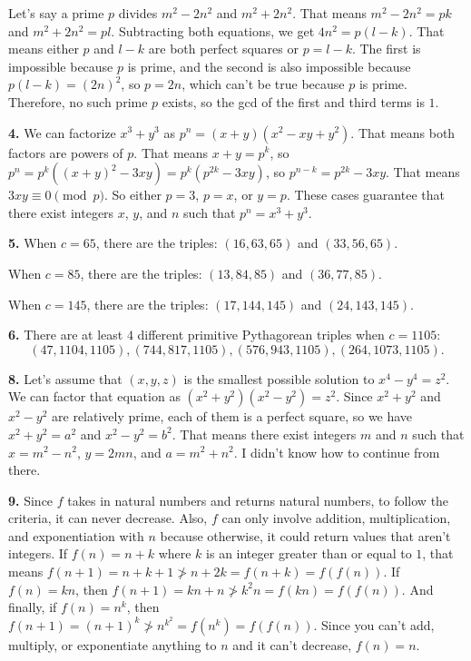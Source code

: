 \documentclass{article}
\begin{document}
Let's say a prime $p$ divides $m^2 - 2n^2$ and $m^2 + 2n^2$. That means $m^2 - 2n^2 = pk$ and $m^2 + 2n^2 = pl$. Subtracting both equations, we get $4n^2 = p(l - k)$. That means either $p$ and $l - k$ are both perfect squares or $p = l - k$. The first is impossible because $p$ is prime, and the second is also impossible because $p(l - k) = (2n)^2$, so $p = 2n$, which can't be true because $p$ is prime. Therefore, no such prime $p$ exists, so the gcd of the first and third terms is $1$.
\newline

\textbf{4.} We can factorize $x^3 + y^3$ as $p^n = (x + y)(x^2 - xy + y^2)$. That means both factors are powers of $p$. That means $x + y = p^k$, so $p^n = p^k((x + y)^2 - 3xy) = p^k(p^{2k} - 3xy)$, so $p^{n - k} = p^{2k} - 3xy$. That means $3xy \equiv 0 \pmod{p}$. So either $p = 3$, $p = x$, or $y = p$. These cases guarantee that there exist integers $x$, $y$, and $n$ such that $p^n = x^3 + y^3$.
\newline

\textbf{5.} When $c = 65$, there are the triples: $(16, 63, 65)$ and $(33, 56, 65)$.

When $c = 85$, there are the triples: $(13, 84, 85)$ and $(36, 77, 85)$.

When $c = 145$, there are the triples: $(17, 144, 145)$ and $(24, 143, 145)$.
\newline

\textbf{6.} There are at least $4$ different primitive Pythagorean triples when $c = 1105$: $$(47, 1104, 1105), (744, 817, 1105), (576, 943, 1105), (264, 1073, 1105).$$

\textbf{8.} Let's assume that $(x, y, z)$ is the smallest possible solution to $x^4 - y^4 = z^2$. We can factor that equation as $(x^2 + y^2)(x^2 - y^2) = z^2$. Since $x^2 + y^2$ and $x^2 - y^2$ are relatively prime, each of them is a perfect square, so we have $x^2 + y^2 = a^2$ and $x^2 - y^2 = b^2$. That means there exist integers $m$ and $n$ such that $x = m^2 - n^2$, $y = 2mn$, and $a = m^2 + n^2$. I didn't know how to continue from there.
\newline

\textbf{9.} Since $f$ takes in natural numbers and returns natural numbers, to follow the criteria, it can never decrease. Also, $f$ can only involve addition, multiplication, and exponentiation with $n$ because otherwise, it could return values that aren't integers. If $f(n) =  n + k$ where $k$ is an integer greater than or equal to $1$, that means $f(n + 1) = n + k + 1 \not > n + 2k = f(n + k) = f(f(n))$. If $f(n) = kn$, then $f(n + 1) = kn + n \not > k^2n = f(kn) = f(f(n))$. And finally, if $f(n) = n^k$, then $f(n + 1) = (n + 1)^k \not > n^{k^2}= f(n^k) = f(f(n))$. Since you can't add, multiply, or exponentiate anything to $n$ and it can't decrease, $f(n) = n$.
\newline
\end{document}
